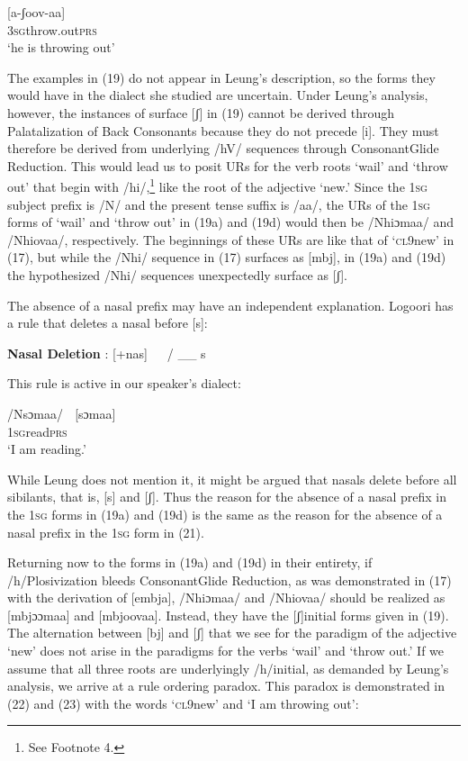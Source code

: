 \documentclass[output=paper]{langsci/langscibook}
\begin{document}
\ea{}
 [a-ʃoov-aa]  \\
\textsc{3sg}throw.out\textsc{prs} \\
\glt ‘he is throwing out’
\z

The examples in (19) do not appear in Leung’s description, so the forms they would have in the dialect she studied are uncertain. Under Leung’s analysis, however, the instances of surface [ʃ] in (19) cannot be derived through Palatalization of Back Consonants because they do not precede [i]. They must therefore be derived from underlying /hV/ sequences through ConsonantGlide Reduction. This would lead us to posit URs for the verb roots ‘wail’ and ‘throw out’ that begin with /hi/,\footnote{   See Footnote 4.} like the root of the adjective ‘new.’ Since the 1\textsc{sg} subject prefix is /N/ and the present tense suffix is /aa/, the URs of the 1\textsc{sg} forms of ‘wail’ and ‘throw out’ in (19a) and (19d) would then be /Nhiɔmaa/ and /Nhiovaa/, respectively. The beginnings of these URs are like that of ‘\textsc{cl}9new’ in (17), but while the /Nhi/ sequence in (17) surfaces as [mbj], in (19a) and (19d) the hypothesized /Nhi/ sequences unexpectedly surface as [ʃ]. 

The absence of a nasal prefix may have an independent explanation. Logoori has a rule that deletes a nasal before [s]:



\ea{}
 \textbf{Nasal Deletion} \citep[116]{Leung1991}: [+nas]   / \_\_ s\\
\z



This rule is active in our speaker’s dialect:


\ea{}
 /Nsɔmaa/    [sɔmaa]\\
\textsc{1sg}read\textsc{prs}\\
\glt ‘I am reading.’
\z

While Leung does not mention it, it might be argued that nasals delete before all sibilants, that is, [s] and [ʃ]. Thus the reason for the absence of a nasal prefix in the 1\textsc{sg} forms in (19a) and (19d) is the same as the reason for the absence of a nasal prefix in the 1\textsc{sg} form in (21). 

Returning now to the forms in (19a) and (19d) in their entirety, if /h/Plosivization bleeds ConsonantGlide Reduction, as was demonstrated in (17) with the derivation of [embja], /Nhiɔmaa/ and /Nhiovaa/ should be realized as [mbjɔɔmaa] and [mbjoovaa]. Instead, they have the [ʃ]initial forms given in (19). The alternation between [bj] and [ʃ] that we see for the paradigm of the adjective ‘new’ does not arise in the paradigms for the verbs ‘wail’ and ‘throw out.’ If we assume that all three roots are underlyingly /h/initial, as demanded by Leung’s analysis, we arrive at a rule ordering paradox. This paradox is demonstrated in (22) and (23) with the words ‘\textsc{cl}9new’ and ‘I am throwing out\textsc{’}:
\end{document}
